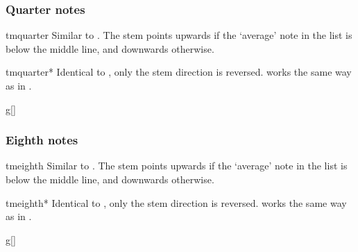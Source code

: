 \documentclass[11pt,a4paper]{ltxdoc}
\begin{document}
\subsubsection{Quarter notes}\label{sec:music-notes:commands:quarter}
\begin{docCommand}{tmquarter}{}
  Similar to . The stem points upwards if the `average' note 
  in the list is below the middle line, and downwards otherwise.
\end{docCommand}
\begin{docCommand}{tmquarter*}{}
  Identical to , only the stem direction is reversed. 
   works the same way as in .
\end{docCommand}
\begin{dispExample}
\begin{tmsinglestaff}%
  \begin{tmstaff}{g}[]
       
  \end{tmstaff}%
\end{tmsinglestaff}
\end{dispExample}
\subsubsection{Eighth notes}\label{sec:music-notes:commands:eighth}
\begin{docCommand}{tmeighth}{}
  Similar to . The stem points upwards if the `average' note 
  in the list is below the middle line, and downwards otherwise.
\end{docCommand}
\begin{docCommand}{tmeighth*}{}
  Identical to , only the stem direction is reversed. 
   works the same way as in .
\end{docCommand}
\begin{dispExample}
\begin{tmsinglestaff}%
  \begin{tmstaff}{g}[]
       
  \end{tmstaff}%
\end{tmsinglestaff}
\end{dispExample}
\end{document}
